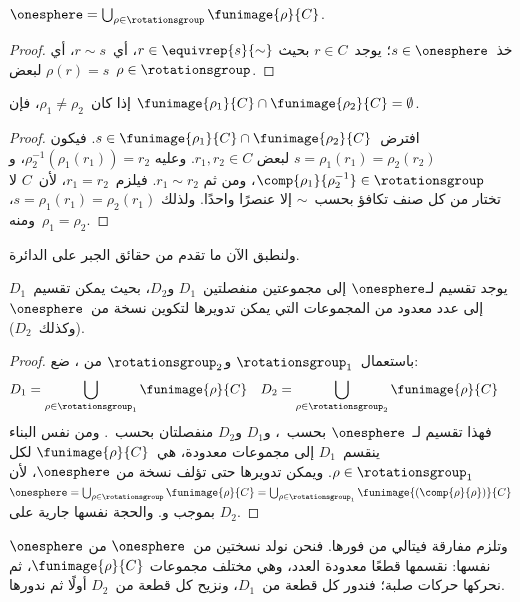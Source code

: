 \documentclass[../../../include/open-logic-section]{subfiles}
\begin{document}
\begin{lem}
$\onesphere = \bigcup_{\rho \in \rotationsgroup} \funimage{\rho}{C}$.
\end{lem}

\begin{proof}
خذ~$s \in \onesphere$؛ يوجد~$r \in C$ بحيث
$r \in \equivrep{s}{\sim}$، أي~$r \sim s$، أي
$\rho(r) = s$ لبعض~$\rho \in \rotationsgroup$.
\end{proof}

\begin{lem}
إذا كان~$\rho_1 \neq \rho_2$، فإن
$\funimage{\rho_1}{C} \cap \funimage{\rho_2}{C} = \emptyset$.
\end{lem}

\begin{proof}
افترض~$s \in \funimage{\rho_{1}}{C} \cap
\funimage{\rho_{2}}{C}$. فيكون
$s = \rho_{1}(r_{1}) = \rho_{2}(r_{2})$ لبعض
$r_{1}, r_{2} \in C$. وعليه
$\rho^{-1}_2(\rho_1(r_1)) = r_2$، و
$\comp{\rho_1}{\rho^{-1}_2} \in \rotationsgroup$، ومن ثم
$r_{1} \sim r_{2}$. فيلزم~$r_1 = r_2$، لأن~$C$ لا تختار من كل صنف
تكافؤ بحسب~$\sim$ إلا عنصرًا واحدًا. ولذلك
$s = \rho_1(r_1) = \rho_2(r_1)$، ومنه~$\rho_1 = \rho_2$.
\end{proof}

ولنطبق الآن ما تقدم من حقائق الجبر على الدائرة.

\begin{lem}
يوجد تقسيم لـ$\onesphere$ إلى مجموعتين منفصلتين~$D_{1}$ و$D_{2}$،
بحيث يمكن تقسيم~$D_{1}$ إلى عدد معدود من المجموعات التي يمكن تدويرها
لتكوين نسخة من~$\onesphere$ (وكذلك~$D_{2}$).
\end{lem}

\begin{proof}
باستعمال~$\rotationsgroup_{1}$ و$\rotationsgroup_{2}$ من
، ضع:
\begin{align*}
	D_{1} &= \bigcup_{\rho \in \rotationsgroup_1} \funimage{\rho}{C} &
	D_{2} &= \bigcup_{\rho \in \rotationsgroup_2} \funimage{\rho}{C}
\end{align*}
فهذا تقسيم لـ~$\onesphere$ بحسب~، و$D_1$ و$D_2$
منفصلتان بحسب~. ومن نفس البناء ينقسم~$D_1$ إلى
مجموعات معدودة، هي~$\funimage{\rho}{C}$ لكل
$\rho \in \rotationsgroup_1$. ويمكن تدويرها حتى تؤلف نسخة من
$\onesphere$، لأن
$\onesphere = \bigcup_{\rho \in
\rotationsgroup}\funimage{\rho}{C} = \bigcup_{\rho \in
\rotationsgroup_1}\funimage{(\comp{\rho}{\rho})}{C}$ بموجب
 و. والحجة نفسها جارية على
$D_2$. \end{proof}\noindent
وتلزم مفارقة فيتالي من فورها. فنحن نولد نسختين من~$\onesphere$ من
$\onesphere$ نفسها: نقسمها قطعًا معدودة العدد، وهي مختلف مجموعات
$\funimage{\rho}{C}$، ثم نحركها حركات صلبة؛ فندور كل قطعة من~$D_1$،
ونزيح كل قطعة من~$D_2$ أولًا ثم ندورها.
\end{document}
